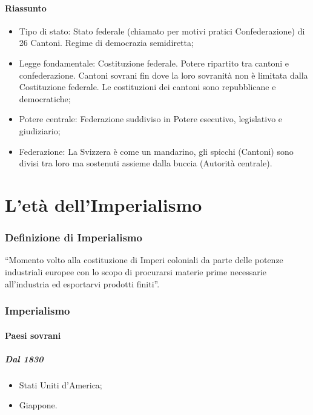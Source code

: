 \documentclass{article}
\begin{document}
\subsection{Riassunto}
\begin{itemize}
    \item Tipo di stato: Stato federale (chiamato per motivi pratici Confederazione) di 26
        Cantoni. Regime di democrazia semidiretta;
    \item Legge fondamentale: Costituzione federale. Potere ripartito tra cantoni e
        confederazione. Cantoni sovrani fin dove la loro sovranità non è limitata dalla
        Costituzione federale. Le costituzioni dei cantoni sono repubblicane e democratiche;
    \item Potere centrale: Federazione suddiviso in Potere esecutivo, legislativo e giudiziario;
    \item Federazione: La Svizzera è come un mandarino, gli spicchi (Cantoni) sono divisi tra
        loro ma sostenuti assieme dalla buccia (Autorità centrale).
\end{itemize}

\newpage
\part{L'età dell'Imperialismo}
\section{Definizione di Imperialismo}
``Momento volto alla costituzione di Imperi coloniali da parte delle potenze industriali europee
con lo scopo di procurarsi materie prime necessarie all’industria ed esportarvi prodotti finiti''.

\section{Imperialismo}
\subsection{Paesi sovrani}

\subsubsection{Dal 1830}
\begin{itemize}
    \item Stati Uniti d’America;
    \item Giappone.
\end{itemize}
\end{document}
